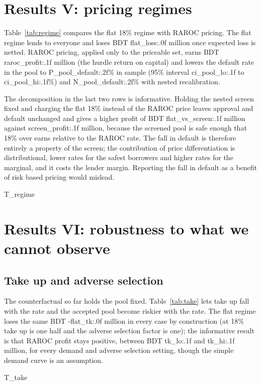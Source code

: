 \documentclass[11pt,a4paper]{article}
\newcommand{\tabsize}{\footnotesize}
\begin{document}
\section{Results V: pricing regimes}\label{sec:regimes}
Table~\ref{tab:regime} compares the flat 18\% regime with RAROC pricing. The flat regime lends to everyone and loses BDT {{flat_loss:.0f}} million once expected loss is netted. RAROC pricing, applied only to the priceable set, earns BDT {{raroc_profit:.1f}} million (the hurdle return on capital) and lowers the default rate in the pool to {{P_pool_default:.2f}}\% in sample (95\% interval {{ci_pool_lo:.1f}} to {{ci_pool_hi:.1f}}\%) and {{N_pool_default:.2f}}\% with nested recalibration.

The decomposition in the last two rows is informative. Holding the nested screen fixed and charging the flat 18\% instead of the RAROC price leaves approval and default unchanged and gives a higher profit of BDT {{flat_vs_screen:.1f}} million against {{screen_profit:.1f}} million, because the screened pool is safe enough that 18\% over earns relative to the RAROC rate. The fall in default is therefore entirely a property of the screen; the contribution of price differentiation is distributional, lower rates for the safest borrowers and higher rates for the marginal, and it costs the lender margin. Reporting the fall in default as a benefit of risk based pricing would mislead.
\begin{table}[H]\centering\tabsize\setlength{\tabcolsep}{3pt}\caption{Pricing regimes (Platt PD).}\label{tab:regime}
{{T_regime}}\end{table}

\section{Results VI: robustness to what we cannot observe}\label{sec:robust}
\subsection{Take up and adverse selection}
The counterfactual so far holds the pool fixed. Table~\ref{tab:take} lets take up fall with the rate and the accepted pool become riskier with the rate. The flat regime loses the same BDT {{-flat_tk:.0f}} million in every case by construction (at 18\% take up is one half and the adverse selection factor is one); the informative result is that RAROC profit stays positive, between BDT {{tk_lo:.1f}} and {{tk_hi:.1f}} million, for every demand and adverse selection setting, though the simple demand curve is an assumption.
\begin{table}[H]\centering\tabsize\caption{Take up and adverse selection (Platt PD).}\label{tab:take}
{{T_take}}\end{table}
\end{document}
